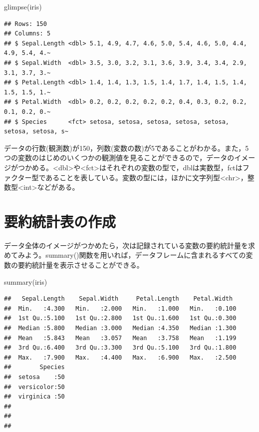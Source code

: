 \documentclass[
]{book}
\newenvironment{Shaded}{\begin{snugshade}}{\end{snugshade}}
\newcommand{\FunctionTok}[1]{\textcolor[rgb]{0.00,0.00,0.00}{#1}}
\newcommand{\NormalTok}[1]{#1}
\begin{document}
\begin{Shaded}
\begin{Highlighting}[]
\FunctionTok{glimpse}\NormalTok{(iris)}
\end{Highlighting}
\end{Shaded}

\begin{verbatim}
## Rows: 150
## Columns: 5
## $ Sepal.Length <dbl> 5.1, 4.9, 4.7, 4.6, 5.0, 5.4, 4.6, 5.0, 4.4, 4.9, 5.4, 4.~
## $ Sepal.Width  <dbl> 3.5, 3.0, 3.2, 3.1, 3.6, 3.9, 3.4, 3.4, 2.9, 3.1, 3.7, 3.~
## $ Petal.Length <dbl> 1.4, 1.4, 1.3, 1.5, 1.4, 1.7, 1.4, 1.5, 1.4, 1.5, 1.5, 1.~
## $ Petal.Width  <dbl> 0.2, 0.2, 0.2, 0.2, 0.2, 0.4, 0.3, 0.2, 0.2, 0.1, 0.2, 0.~
## $ Species      <fct> setosa, setosa, setosa, setosa, setosa, setosa, setosa, s~
\end{verbatim}

データの行数(観測数)が150，列数(変数の数)が5であることがわかる。また，5つの変数のはじめのいくつかの観測値を見ることができるので，データのイメージがつかめる。\textless dbl\textgreater や\textless fct\textgreater はそれぞれの変数の型で，dblは実数型，fctはファクター型であることを表している。変数の型には，ほかに文字列型\textless chr\textgreater，整数型\textless int\textgreater などがある。

\hypertarget{ux8981ux7d04ux7d71ux8a08ux8868ux306eux4f5cux6210}{%
\section{要約統計表の作成}\label{ux8981ux7d04ux7d71ux8a08ux8868ux306eux4f5cux6210}}

データ全体のイメージがつかめたら，次は記録されている変数の要約統計量を求めてみよう。summary()関数を用いれば，データフレームに含まれるすべての変数の要約統計量を表示させることができる。

\begin{Shaded}
\begin{Highlighting}[]
\FunctionTok{summary}\NormalTok{(iris)}
\end{Highlighting}
\end{Shaded}

\begin{verbatim}
##   Sepal.Length    Sepal.Width     Petal.Length    Petal.Width   
##  Min.   :4.300   Min.   :2.000   Min.   :1.000   Min.   :0.100  
##  1st Qu.:5.100   1st Qu.:2.800   1st Qu.:1.600   1st Qu.:0.300  
##  Median :5.800   Median :3.000   Median :4.350   Median :1.300  
##  Mean   :5.843   Mean   :3.057   Mean   :3.758   Mean   :1.199  
##  3rd Qu.:6.400   3rd Qu.:3.300   3rd Qu.:5.100   3rd Qu.:1.800  
##  Max.   :7.900   Max.   :4.400   Max.   :6.900   Max.   :2.500  
##        Species  
##  setosa    :50  
##  versicolor:50  
##  virginica :50  
##                 
##                 
## 
\end{verbatim}
\end{document}
